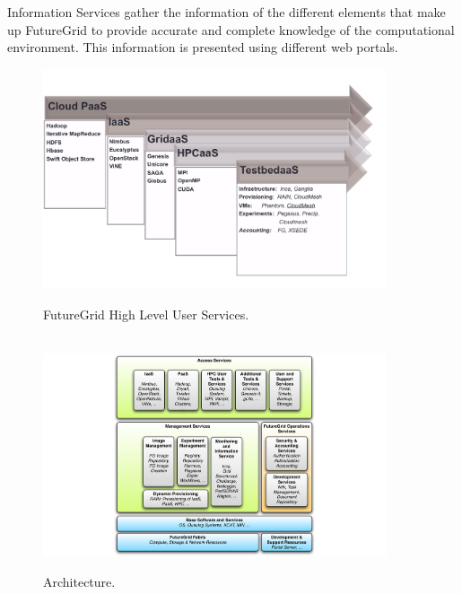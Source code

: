 Information Services gather the information of the different elements that make up FutureGrid to provide accurate and complete knowledge of the computational environment. This information is presented using different web portals.

\begin{figure}[p]
  \centering
    \includegraphics[width=0.9\textwidth]{images/user-services.pdf}
  \caption{FutureGrid High Level User Services.}
  ~\\
  \centering
  \includegraphics[width=0.9\textwidth]{images/architecture.pdf}
  \caption{Architecture.}
\end{figure}

